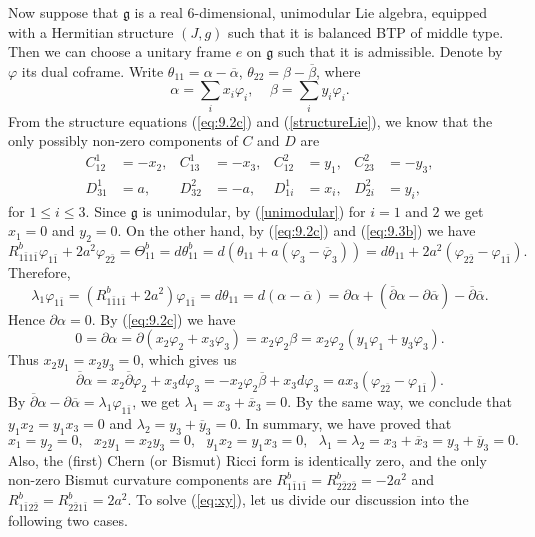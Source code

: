 \documentclass{amsart}
\numberwithin{equation}{section}
\theoremstyle{definition}
\renewcommand{\1}{\mathds{1}}
\renewcommand{\>}{\rightarrow}
\begin{document}
Now suppose that ${\mathfrak g}$ is a real $6$-dimensional, unimodular Lie algebra, equipped with a Hermitian structure $(J,g)$ such that it is balanced BTP of middle type. Then we can choose a unitary frame $e$ on ${\mathfrak g}$ such that it is admissible. Denote by $\varphi$ its dual coframe. Write $\theta_{11}=\alpha -\overline{\alpha}$, $\theta_{22}=\beta -\overline{\beta}$, where
$$ \alpha = \sum_i x_i\varphi_i, \ \ \ \ \ \beta = \sum_i y_i\varphi_i. $$
From the structure equations (\ref{eq:9.2c}) and (\ref{structureLie}), we know that the only possibly non-zero components of $C$ and $D$ are
\begin{align*} \label{CandD}
C^1_{12}&=-x_2, &  C^1_{13}&=-x_3, & C^2_{12}&=y_1, & C^2_{23}&=-y_3,\\
D^1_{31}&=a,& D^2_{32}&=-a, & D^1_{1i}&=x_i, & D^2_{2i}&=y_i,
\end{align*}
for $1\leq i\leq 3$. Since ${\mathfrak g}$ is unimodular, by (\ref{unimodular}) for $i=1$ and $2$ we get $x_1=0$ and $y_2=0$. On the other hand, by (\ref{eq:9.2c}) and (\ref{eq:9.3b}) we have
$$ R^b_{1\bar{1}1\bar{1}} \varphi_{1\bar{1}} + 2a^2 \varphi_{2\bar{2}}  = \Theta^b_{11}= d\theta^b_{11}=d(\theta_{11}+a(\varphi_3-\overline{\varphi}_3)) = d\theta_{11} + 2a^2 (\varphi_{2\bar{2}}-\varphi_{1\bar{1}}). $$
Therefore,
$$ \lambda_1 \varphi_{1\bar{1}} =  (R^b_{1\bar{1}1\bar{1}}  + 2a^2)\varphi_{1\bar{1}} = d\theta_{11} = d(\alpha -\overline{\alpha}) =\partial \alpha + (\overline{\partial}\alpha - \partial \overline{\alpha} ) - \overline{\partial} \overline{\alpha} . $$
Hence $\partial \alpha =0$. By (\ref{eq:9.2c}) we have
$$ 0 = \partial \alpha =  \partial (x_2 \varphi_2 +x_3\varphi_3) = x_2 \varphi_2 \beta = x_2\varphi_2 (y_1\varphi_1 + y_3\varphi_3). $$
Thus $x_2y_1=x_2y_3=0$, which gives us
$$ \overline{\partial}\alpha = x_2 \overline{\partial}\varphi_2 + x_3 d\varphi_3 = - x_2 \varphi_2 \overline{\beta} + x_3 d\varphi_3
= ax_3 (\varphi_{2\bar{2}} - \varphi_{1\bar{1}}). $$
By $\overline{\partial}\alpha-\partial \overline{\alpha} = \lambda_1 \varphi_{1\bar{1}}$, we get $\lambda_1=x_3+\overline{x}_3=0$. By the same way, we conclude that  $y_1x_2=y_1x_3=0$ and $\lambda_2 = y_3+\overline{y}_3=0$. In summary, we have proved that
\begin{equation} \label{eq:xy}
x_1=y_2=0, \ \ \ x_2y_1=x_2y_3=0, \ \ \ y_1x_2=y_1x_3=0, \ \ \ \lambda_1=\lambda_2= x_3+\overline{x}_3=y_3+\overline{y}_3=0.
\end{equation}
Also, the (first) Chern (or Bismut) Ricci form is identically zero, and the only non-zero Bismut curvature components are $R^b_{1\bar{1}1\bar{1}}=R^b_{2\bar{2}2\bar{2}}=-2a^2$ and $R^b_{1\bar{1}2\bar{2}}=R^b_{2\bar{2}1\bar{1}}=2a^2$. To solve (\ref{eq:xy}), let us divide our discussion into the following two cases.
\end{document}
